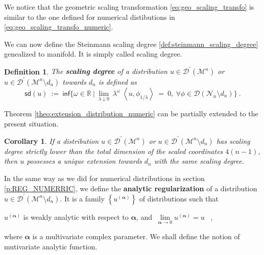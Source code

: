 \documentclass[11pt]{book}
\newcommand{\sd}{\mathsf{sd}}
\renewcommand{\inf}{\mathsf{inf}}
\newcommand{\alphabd}{\boldsymbol{\alpha}}
\newcommand{\sm}[1]{\left\langle#1\right\rangle}
\newcommand{\Dcal}{\mathcal{D}}
\newcommand{\Mcal}{\mathcal{M}}
\newcommand{\Ncal}{\mathcal{N}}
\newcommand{\Rbb}{\mathbb{R}}
\theoremstyle{break}
\newtheorem{corollary}{Corollary}[chapter]
\newtheorem{definition}{Definition}[chapter]
\begin{document}
We notice that the geometric scaling transformation \eqref{eq:geo_scaling_transfo} is similar to the one defined for numerical distibutions in \eqref{eq:geo_scaling_transfo_numeric}. 


We can now define the Steinmann scaling degree \ref{def:steinmann_scaling_degree} genealized to manifold. It is simply called scaling degree.


\begin{definition}\label{def:scaling_degree}
The \textbf{scaling degree} of a distribution $u \in \Dcal^\prime(\Mcal^n)$ or $u \in \Dcal^\prime(\Mcal^n \setminus d_n)$ towards $d_n$ is defined as 
%
\begin{equation*}
\sd(u) \ := \ \inf\bigg\{ \omega \in \Rbb \ \bigg| \ \lim_{\lambda \downarrow 0} \ \lambda^\omega \ \sm{u,\phi_{1/\lambda}} \ = \ 0, \ \forall \phi\in\Dcal(\Ncal_n\setminus d_n) \bigg\} \ .
\end{equation*}
%
\end{definition}
%
Theorem \ref{theo:extension_distribution_numeric} can be partially extended to the present situation. 


\begin{corollary}\label{corol:theo_sd_M}
If a distribution $u \in\Dcal^\prime(\Mcal^n)$ or $u\in\Dcal^\prime(\Mcal^n\setminus d_n)$ has scaling degree strictly lower than the total dimension of the scaled coordinates $4(n-1)$, then $u$ possesses a unique extension towards $d_n$ with the same scaling degree. 
\end{corollary}


In the same way as we did for numerical distributions in section \ref{p:REG_NUMERRIC}, we define the \textbf{analytic regularization} of a distribution $u \in \Dcal^\prime(\Mcal^n\setminus d_n)$. It is a family $\left\{ u^{(\alphabd)}\right\}$ of distributions such that
%
\begin{center}
$u^{(\alphabd)}$ is weakly analytic with respect to $\alphabd$, and $\ \underset{\alphabd\to 0}{\lim} u^{(\alphabd)} = u$ \ ,
\end{center}
%
where $\alphabd$ is a multivariate complex parameter. We shall define the notion of mutivariate analytic function.
\end{document}
